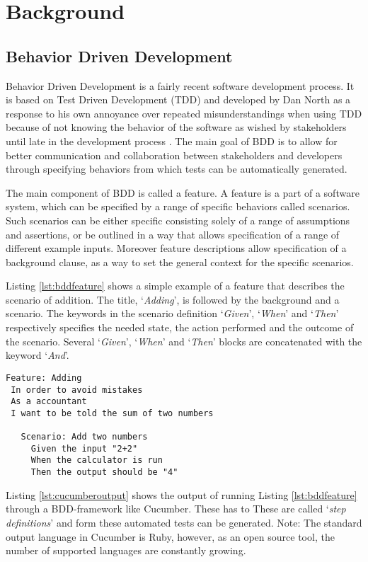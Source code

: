 \section{Background}

\subsection{Behavior Driven Development}
\label{sub:bdd}
Behavior Driven Development is a fairly recent software development process. 
It is based on Test Driven Development (TDD) and developed by Dan North as a response to his own annoyance over repeated misunderstandings when using TDD because of not knowing the behavior of the software as wished by stakeholders until late in the development process \cite{north2006}. 
The main goal of BDD is to allow for better communication and collaboration between stakeholders and developers through specifying behaviors from which tests can be automatically generated. 

The main component of BDD is called a feature. 
A feature is a part of a software system,
which can be specified by a range of specific behaviors called scenarios.
Such scenarios can be either specific consisting solely of a range of
assumptions and assertions, or be outlined in a way that allows
specification of a range of different example inputs.
Moreover feature descriptions allow specification of a background clause,
as a way to set the general context for the specific scenarios.

Listing \ref{lst:bddfeature} shows a simple example of a feature that describes the scenario of addition. 
The title, `\emph{Adding}', is followed by the background and a scenario. The keywords in the scenario definition `\emph{Given}', `\emph{When}' and `\emph{Then}' respectively specifies the needed state, the action performed and the outcome of the scenario. 
Several `\emph{Given}', `\emph{When}' and `\emph{Then}' blocks are concatenated with the keyword `\emph{And}'.

\begin{lstlisting}[caption={Sample Addition Feature},label={lst:bddfeature}]
Feature: Adding
 In order to avoid mistakes 
 As a accountant
 I want to be told the sum of two numbers

   Scenario: Add two numbers
     Given the input "2+2"
     When the calculator is run 
     Then the output should be "4"
\end{lstlisting}

Listing \ref{lst:cucumberoutput} shows the output of running Listing \ref{lst:bddfeature} through a BDD-framework like Cucumber. These has to 
These are called `\emph{step definitions}' and form these automated tests can be generated. 
Note: The standard output language in Cucumber is Ruby, however, as an open source tool, the number of supported languages are constantly growing. 

